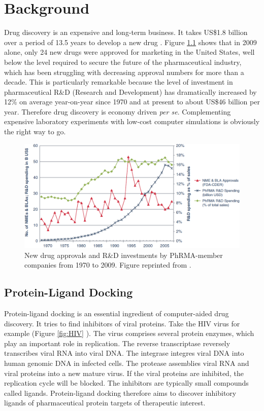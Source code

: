 \chapter{Background}

Drug discovery is an expensive and long-term business. It takes US\$1.8 billion over a period of 13.5 years to develop a new drug \citep{716}. Figure \ref{fig:NewDrugApprovals} \citep{686} shows that in 2009 alone, only 24 new drugs were approved for marketing in the United States, well below the level required to secure the future of the pharmaceutical industry, which has been struggling with decreasing approval numbers for more than a decade. This is particularly remarkable because the level of investment in pharmaceutical R\&D (Research and Development) has dramatically increased by 12\% on average year-on-year since 1970 and at present to about US\$46 billion per year. Therefore drug discovery is economy driven \textit{per se}. Complementing expensive laboratory experiments with low-cost computer simulations is obviously the right way to go.

\begin{figure}
\centering
\includegraphics[width=\textwidth]{Background/NewDrugApprovals.png}
\caption{New drug approvals and R\&D investments by PhRMA-member companies from 1970 to 2009. Figure reprinted from \citep{686}.}
\label{fig:NewDrugApprovals}
\end{figure}

\section{Protein-Ligand Docking}

Protein-ligand docking is an essential ingredient of computer-aided drug discovery. It tries to find inhibitors of viral proteins. Take the HIV virus for example (Figure \ref{fig:HIV} \citep{296}). The virus comprises several protein enzymes, which play an important role in replication. The reverse transcriptase reversely transcribes viral RNA into viral DNA. The integrase integres viral DNA into human genomic DNA in infected cells. The protease assemblies viral RNA and viral proteins into a new mature virus. If the viral proteins are inhibited, the replication cycle will be blocked. The inhibitors are typically small compounds called ligands. Protein-ligand docking therefore aims to discover inhibitory ligands of pharmaceutical protein targets of therapeutic interest.

